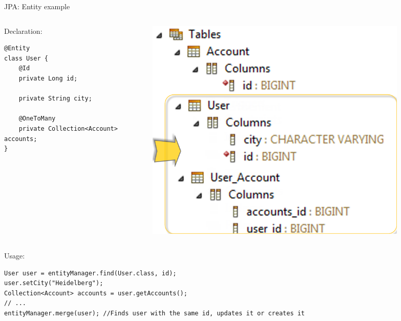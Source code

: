 \begin{frame}[fragile]{JPA: Entity example}
\begin{columns}
	\begin{column}[T]{.5\textwidth}	
		Declaration:
\begin{lstlisting}
@Entity
class User {
    @Id
    private Long id;

    private String city;

    @OneToMany
    private Collection<Account> accounts;
}
\end{lstlisting}
	\end{column}
	\begin{column}[T]{.45\textwidth}	
		\begin{figure}
	  		\includegraphics[width=0.9\textwidth]{../ConnectDatabase/images/EntityTables}
		\end{figure}
	\end{column}
\end{columns}
Usage:
\begin{lstlisting}
User user = entityManager.find(User.class, id);
user.setCity("Heidelberg");
Collection<Account> accounts = user.getAccounts();
// ...
entityManager.merge(user); //Finds user with the same id, updates it or creates it
\end{lstlisting}
\end{frame}


